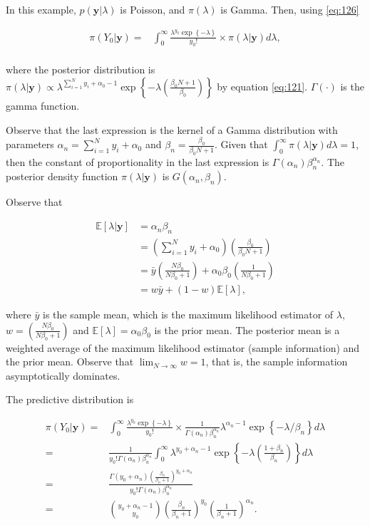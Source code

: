 In this example, $p(\mathbf{y}|\lambda)$ is Poisson, and $\pi(\lambda)$ is Gamma. Then, using \ref{eq:126} 

\begin{align*}
	\pi(Y_0|\mathbf{y})=&\int_{0}^{\infty}\frac{\lambda^{y_0}\exp\left\{-\lambda\right\}}{y_0!}\times \pi(\lambda|\mathbf{y})d\lambda,\\
\end{align*}

where the posterior distribution is $\pi(\lambda|\mathbf{y})\propto \lambda^{\sum_{i=1}^N y_i + \alpha_0 - 1}\exp\left\{-\lambda\left(\frac{\beta_0 N+1}{\beta_0}\right)\right\}$ by equation \ref{eq:121}. $\Gamma(\cdot)$ is the gamma function.

Observe that the last expression is the kernel of a Gamma distribution with parameters $\alpha_n=\sum_{i=1}^N y_i + \alpha_0$ and $\beta_n=\frac{\beta_0}{\beta_0 N + 1}$. Given that $\int_0^{\infty}\pi(\lambda|\mathbf{y})d\lambda=1$, then the constant of proportionality in the last expression is $\Gamma(\alpha_n)\beta_n^{\alpha_n}$. The posterior density function $\pi(\lambda|\mathbf{y})$ is $G(\alpha_n,\beta_n)$.

Observe that 

\begin{align*}
	\mathbb{E}[\lambda|\mathbf{y}]&=\alpha_n\beta_n\\
	&=\left(\sum_{i=1}^N y_i + \alpha_0\right)\left(\frac{\beta_0}{\beta_0 N + 1}\right)\\
	&=\bar{y}\left(\frac{N\beta_0}{N\beta_0+1}\right)+\alpha_0\beta_0\left(\frac{1}{N\beta_0+1}\right)\\
	&=w\bar{y}+(1-w)\mathbb{E}[\lambda],
\end{align*}

where $\bar{y}$ is the sample mean, which is the maximum likelihood estimator of $\lambda$, $w=\left(\frac{N\beta_0}{N\beta_0+1}\right)$ and $\mathbb{E}[\lambda]=\alpha_0\beta_0$ is the prior mean. The posterior mean is a weighted average of the maximum likelihood estimator (sample information) and the prior mean. Observe that $\lim_{N\rightarrow\infty}w= 1$, that is, the sample information asymptotically dominates.

The predictive distribution is

\begin{align*}
	\pi(Y_0|\mathbf{y})=&\int_{0}^{\infty}\frac{\lambda^{y_0}\exp\left\{-\lambda\right\}}{y_0!}\times \frac{1}{\Gamma(\alpha_n)\beta_n^{\alpha_n}}\lambda^{\alpha_n-1}\exp\left\{-\lambda/\beta_n\right\} d\lambda\\
	=&\frac{1}{y_0!\Gamma(\alpha_n)\beta_n^{\alpha_n}}\int_{0}^{\infty}\lambda^{y_0+\alpha_n-1}\exp\left\{-\lambda\left(\frac{1+\beta_n}{\beta_n}\right)\right\}d\lambda\\
	=&\frac{\Gamma(y_0+\alpha_n)\left(\frac{\beta_n}{\beta_n+1}\right)^{y_0+\alpha_n}}{y_0!\Gamma(\alpha_n)\beta_n^{\alpha_n}}\\
	=&{y_0+\alpha_n-1 \choose y_0}\left(\frac{\beta_n}{\beta_n+1}\right)^{y_0}\left(\frac{1}{\beta_n+1}\right)^{\alpha_n}.
\end{align*}

